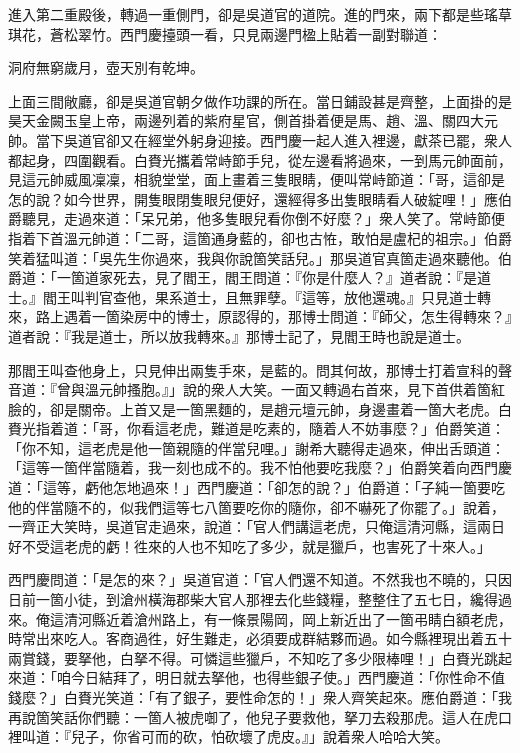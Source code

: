 進入第二重殿後，轉過一重側門，卻是吳道官的道院。進的門來，兩下都是些瑤草琪花，蒼松翠竹。西門慶擡頭一看，只見兩邊門楹上貼着一副對聯道：

\begin{myquote}
洞府無窮歲月，壺天別有乾坤。
\end{myquote}

上面三間敞廳，卻是吳道官朝夕做作功課的所在。當日鋪設甚是齊整，上面掛的是昊天金闕玉皇上帝，兩邊列着的紫府星官，側首掛着便是馬、趙、溫、關四大元帥。{}當下吳道官卻又在經堂外躬身迎接。西門慶一起人進入裡邊，獻茶已罷，衆人都起身，四圍觀看。白賚光攜着常峙節手兒，從左邊看將過來，一到馬元帥面前，見這元帥威風凜凜，相貌堂堂，面上畫着三隻眼睛，便叫常峙節道：「哥，這卻是怎的說？如今世界，開隻眼閉隻眼兒便好，還經得多出隻眼睛看人破綻哩！」應伯爵聽見，走過來道：「呆兄弟，他多隻眼兒看你倒不好麼？」{}衆人笑了。常峙節便指着下首溫元帥道：「二哥，這箇通身藍的，卻也古恠，敢怕是盧杞的祖宗。」伯爵笑着猛叫道：「吳先生你過來，我與你說箇笑話兒。」那吳道官真箇走過來聽他。伯爵道：「一箇道家死去，見了閻王，閻王問道：『你是什麼人？』道者說：『是道士。』閻王叫判官查他，果系道士，且無罪孽。『這等，放他還魂。』只見道士轉來，路上遇着一箇染房中的博士，原認得的，那博士問道：『師父，怎生得轉來？』道者說：『我是道士，所以放我轉來。』那博士記了，見閻王時也說是道士。

那閻王叫查他身上，只見伸出兩隻手來，是藍的。問其何故，那博士打着宣科的聲音道：『曾與溫元帥搔胞。』」說的衆人大笑。一面又轉過右首來，見下首供着箇紅臉的，卻是關帝。上首又是一箇黑麵的，是趙元壇元帥，身邊畫着一箇大老虎。白賚光指着道：「哥，你看這老虎，難道是吃素的，隨着人不妨事麼？」伯爵笑道：「你不知，這老虎是他一箇親隨的伴當兒哩。」謝希大聽得走過來，伸出舌頭道：「這等一箇伴當隨着，我一刻也成不的。我不怕他要吃我麼？」伯爵笑着向西門慶道：「這等，虧他怎地過來！」西門慶道：「卻怎的說？」伯爵道：「子純一箇要吃他的伴當隨不的，似我們這等七八箇要吃你的隨你，卻不嚇死了你罷了。」{}說着，一齊正大笑時，吳道官走過來，說道：「官人們講這老虎，{}只俺這清河縣，這兩日好不受這老虎的虧！徃來的人也不知吃了多少，就是獵戶，也害死了十來人。」

西門慶問道：「是怎的來？」吳道官道：「官人們還不知道。不然我也不曉的，只因日前一箇小徒，到滄州橫海郡柴大官人那裡去化些錢糧，{}整整住了五七日，纔得過來。俺這清河縣近着滄州路上，有一條景陽岡，岡上新近出了一箇弔睛白額老虎，時常出來吃人。客商過徃，好生難走，必須要成群結夥而過。如今縣裡現出着五十兩賞錢，要拏他，白拏不得。可憐這些獵戶，不知吃了多少限棒哩！」白賚光跳起來道：「咱今日結拜了，明日就去拏他，也得些銀子使。」西門慶道：「你性命不值錢麼？」白賚光笑道：「有了銀子，要性命怎的！」衆人齊笑起來。應伯爵道：「我再說箇笑話你們聽：一箇人被虎啣了，他兒子要救他，拏刀去殺那虎。這人在虎口裡叫道：『兒子，你省可而的砍，怕砍壞了虎皮。』」{}說着衆人哈哈大笑。

